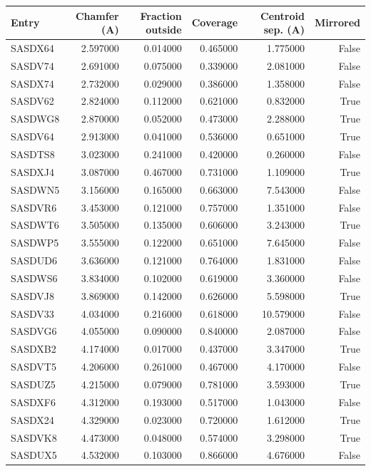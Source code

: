 \begin{tabular}{lrrrrr}
\toprule
Entry & Chamfer (A) & Fraction outside & Coverage & Centroid sep. (A) & Mirrored \\
\midrule
SASDX64 & 2.597000 & 0.014000 & 0.465000 & 1.775000 & False \\
SASDV74 & 2.691000 & 0.075000 & 0.339000 & 2.081000 & False \\
SASDX74 & 2.732000 & 0.029000 & 0.386000 & 1.358000 & False \\
SASDV62 & 2.824000 & 0.112000 & 0.621000 & 0.832000 & True \\
SASDWG8 & 2.870000 & 0.052000 & 0.473000 & 2.288000 & True \\
SASDV64 & 2.913000 & 0.041000 & 0.536000 & 0.651000 & True \\
SASDTS8 & 3.023000 & 0.241000 & 0.420000 & 0.260000 & False \\
SASDXJ4 & 3.087000 & 0.467000 & 0.731000 & 1.109000 & True \\
SASDWN5 & 3.156000 & 0.165000 & 0.663000 & 7.543000 & False \\
SASDVR6 & 3.453000 & 0.121000 & 0.757000 & 1.351000 & False \\
SASDWT6 & 3.505000 & 0.135000 & 0.606000 & 3.243000 & True \\
SASDWP5 & 3.555000 & 0.122000 & 0.651000 & 7.645000 & False \\
SASDUD6 & 3.636000 & 0.121000 & 0.764000 & 1.831000 & False \\
SASDWS6 & 3.834000 & 0.102000 & 0.619000 & 3.360000 & False \\
SASDVJ8 & 3.869000 & 0.142000 & 0.626000 & 5.598000 & True \\
SASDV33 & 4.034000 & 0.216000 & 0.618000 & 10.579000 & False \\
SASDVG6 & 4.055000 & 0.090000 & 0.840000 & 2.087000 & False \\
SASDXB2 & 4.174000 & 0.017000 & 0.437000 & 3.347000 & True \\
SASDVT5 & 4.206000 & 0.261000 & 0.467000 & 4.170000 & False \\
SASDUZ5 & 4.215000 & 0.079000 & 0.781000 & 3.593000 & True \\
SASDXF6 & 4.312000 & 0.193000 & 0.517000 & 1.043000 & False \\
SASDX24 & 4.329000 & 0.023000 & 0.720000 & 1.612000 & True \\
SASDVK8 & 4.473000 & 0.048000 & 0.574000 & 3.298000 & True \\
SASDUX5 & 4.532000 & 0.103000 & 0.866000 & 4.676000 & False \\

\end{tabular}
